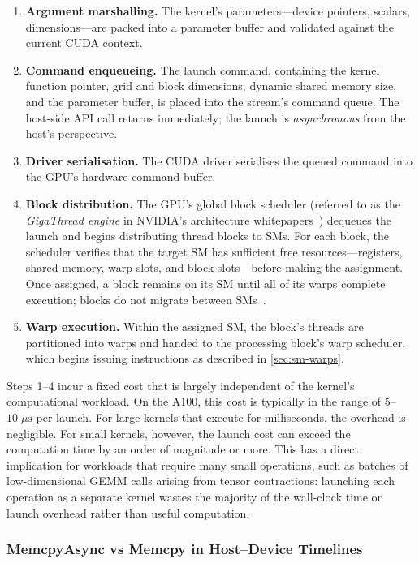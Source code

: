 \begin{enumerate}
  \item \textbf{Argument marshalling.} The kernel's parameters---device
    pointers, scalars, dimensions---are packed into a parameter buffer and
    validated against the current CUDA context.
  \item \textbf{Command enqueueing.} The launch command, containing the kernel
    function pointer, grid and block dimensions, dynamic shared memory size,
    and the parameter buffer, is placed into the stream's command queue. The
    host-side API call returns immediately; the launch is \emph{asynchronous}
    from the host's perspective.
  \item \textbf{Driver serialisation.} The CUDA driver serialises the queued
    command into the GPU's hardware command buffer.
  \item \textbf{Block distribution.} The GPU's global block scheduler (referred
    to as the \emph{GigaThread engine} in NVIDIA's architecture
    whitepapers~\cite{nvidia2020a100}) dequeues the launch and begins
    distributing thread blocks to SMs. For each block, the scheduler verifies
    that the target SM has sufficient free resources---registers, shared
    memory, warp slots, and block slots---before making the assignment. Once
    assigned, a block remains on its SM until all of its warps complete
    execution; blocks do not migrate between
    SMs~\cite{nvidia-cuda-guide}.
  \item \textbf{Warp execution.} Within the assigned SM, the block's threads
    are partitioned into warps and handed to the processing block's warp
    scheduler, which begins issuing instructions as described in
    \cref{sec:sm-warps}.
\end{enumerate}

Steps 1--4 incur a fixed cost that is largely independent of the kernel's
computational workload. On the A100, this cost is typically in the range of
$5$--$10\;\mu\text{s}$ per launch. For large kernels that execute for
milliseconds, the overhead is negligible. For small kernels, however, the
launch cost can exceed the computation time by an order of magnitude or more.
This has a direct implication for workloads that require many small operations,
such as batches of low-dimensional GEMM calls arising from tensor
contractions: launching each operation as a separate kernel wastes the
majority of the wall-clock time on launch overhead rather than useful
computation.

\subsubsection{MemcpyAsync vs Memcpy in Host--Device Timelines}
\label{sec:memcpy-async-vs-sync}


